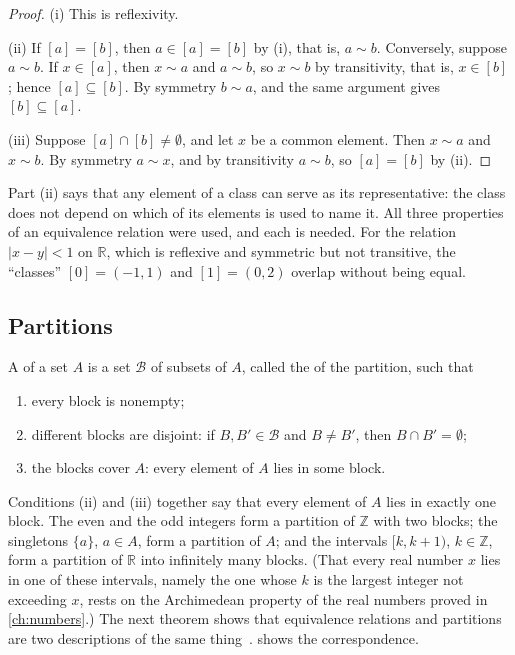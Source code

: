 \begin{proof}
(i) This is reflexivity.

(ii) If $[a]=[b]$, then $a\in[a]=[b]$ by (i), that is, $a\sim b$. Conversely, suppose $a\sim b$. If $x\in[a]$, then $x\sim a$ and $a\sim b$, so $x\sim b$ by transitivity, that is, $x\in[b]$; hence $[a]\subseteq[b]$. By symmetry $b\sim a$, and the same argument gives $[b]\subseteq[a]$.

(iii) Suppose $[a]\cap[b]\ne\emptyset$, and let $x$ be a common element. Then $x\sim a$ and $x\sim b$. By symmetry $a\sim x$, and by transitivity $a\sim b$, so $[a]=[b]$ by (ii).
\end{proof}

Part (ii) says that any element of a class can serve as its representative: the class does not depend on which of its elements is used to name it. All three properties of an equivalence relation were used, and each is needed. For the relation $|x-y|<1$ on $\mathbb R$, which is reflexive and symmetric but not transitive, the ``classes'' $[0]=(-1,1)$ and $[1]=(0,2)$ overlap without being equal.

\subsection{Partitions}

\begin{definition}[Partition]
\label{def:partition}
A  of a set $A$ is a set $\mathcal B$ of subsets of $A$, called the  of the partition, such that
\begin{enumerate}
\item every block is nonempty;
\item different blocks are disjoint: if $B,B'\in\mathcal B$ and $B\ne B'$, then $B\cap B'=\emptyset$;
\item the blocks cover $A$: every element of $A$ lies in some block.
\end{enumerate}
\end{definition}

Conditions (ii) and (iii) together say that every element of $A$ lies in exactly one block. The even and the odd integers form a partition of $\mathbb Z$ with two blocks; the singletons $\{a\}$, $a\in A$, form a partition of $A$; and the intervals $[k,k+1)$, $k\in\mathbb Z$, form a partition of $\mathbb R$ into infinitely many blocks. (That every real number $x$ lies in one of these intervals, namely the one whose $k$ is the largest integer not exceeding $x$, rests on the Archimedean property of the real numbers proved in \cref{ch:numbers}.) The next theorem shows that equivalence relations and partitions are two descriptions of the same thing~\cite{halmos1960naive,enderton1977sets}.  shows the correspondence.

